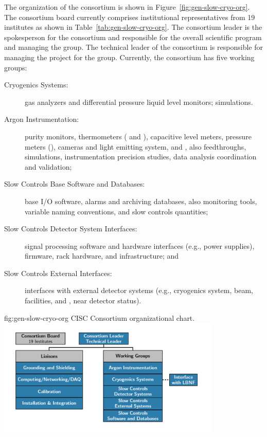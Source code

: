 The organization of the  consortium is shown in
 Figure~\ref{fig:gen-slow-cryo-org}. The  consortium board currently comprises institutional representatives from 19 institutes as shown in Table~\ref{tab:gen-slow-cryo-org}.  The consortium leader is the spokesperson for the consortium and responsible for the overall scientific program and managing the group. The technical leader of the consortium is responsible for managing the project for the group. Currently, the
consortium has five working groups:
\begin{description}
 \item[Cryogenics Systems:] gas analyzers and differential pressure liquid level
  monitors;  simulations.
 \item[Argon Instrumentation:] purity monitors, thermometers ( and ), capacitive level meters, pressure meters (), cameras and light emitting system, and , also feedthroughs, \efield simulations, instrumentation precision studies,  data analysis coordination and validation; 
 \item [Slow Controls Base Software and Databases:]  base I/O software, alarms and archiving databases, also monitoring tools,
   variable naming conventions, and slow controls quantities;
 \item [Slow Controls Detector System Interfaces:] signal processing software and hardware interfaces (e.g., power supplies), firmware, rack hardware, and infrastructure;   and 
 \item [Slow Controls External Interfaces:] interfaces with external detector systems (e.g., cryogenics system, beam, facilities, and , near detector status).
\end{description}

\begin{dunefigure}{fig:gen-slow-cryo-org}
{CISC Consortium organizational chart.}
\includegraphics[width=0.8\textwidth]{graphics/cisc_org_20190716_zoomedin.png}
\end{dunefigure}

